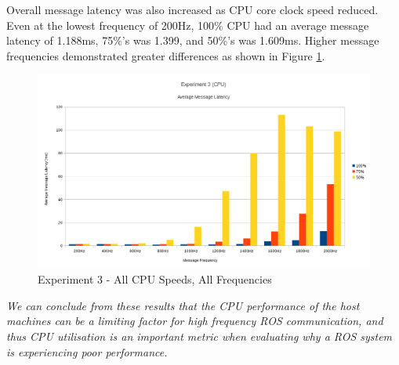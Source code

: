 \documentclass[../dissertation.tex]{subfiles}
\begin{document}
Overall message latency was also increased as CPU core clock speed reduced. Even at the lowest frequency of 200Hz, 100\% CPU had an average message latency of 1.188ms, 75\%'s was 1.399, and 50\%'s was 1.609ms. Higher message frequencies demonstrated greater differences as shown in Figure \ref{exp3-averages}.

\begin{figure}[H]
\centering
\includegraphics[width=\textwidth]{images/experiment3/average_per_frequency_graph.png}
\caption{Experiment 3 - All CPU Speeds, All Frequencies}
\label{exp3-averages}
\end{figure}

\textit{We can conclude from these results that the CPU performance of the host machines can be a limiting factor for high frequency ROS communication, and thus CPU utilisation is an important metric when evaluating why a ROS system is experiencing poor performance.}
\end{document}
